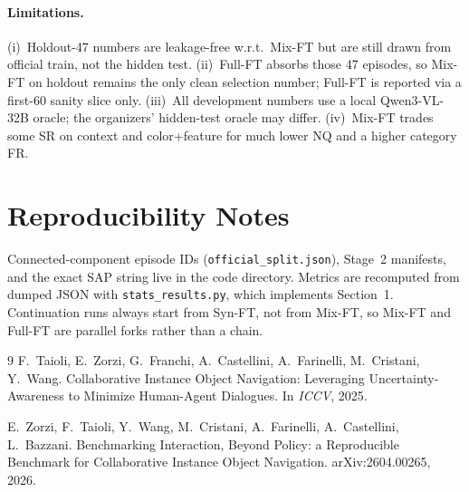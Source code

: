 \documentclass[10pt,a4paper]{article}
\begin{document}
\paragraph{Limitations.}
(i)~Holdout-47 numbers are leakage-free w.r.t.\ Mix-FT but are still
drawn from official train, not the hidden test.
(ii)~Full-FT absorbs those 47 episodes, so Mix-FT on holdout remains
the only clean selection number; Full-FT is reported via a first-60
sanity slice only.
(iii)~All development numbers use a local Qwen3-VL-32B oracle; the
organizers' hidden-test oracle may differ.
(iv)~Mix-FT trades some SR on context and color+feature for much lower
NQ and a higher category FR.

\section{Reproducibility Notes}
Connected-component episode IDs (\texttt{official\_split.json}),
Stage~2 manifests, and the exact SAP string live in the code directory.
Metrics are recomputed from dumped JSON with
\texttt{stats\_results.py}, which implements Section~1.
Continuation runs always start from Syn-FT, not from Mix-FT, so Mix-FT
and Full-FT are parallel forks rather than a chain.

\begin{thebibliography}{9}
F.~Taioli, E.~Zorzi, G.~Franchi, A.~Castellini, A.~Farinelli,
M.~Cristani, Y.~Wang.
Collaborative Instance Object Navigation: Leveraging Uncertainty-Awareness
to Minimize Human-Agent Dialogues. In \emph{ICCV}, 2025.

E.~Zorzi, F.~Taioli, Y.~Wang, M.~Cristani, A.~Farinelli, A.~Castellini,
L.~Bazzani.
Benchmarking Interaction, Beyond Policy: a Reproducible Benchmark for
Collaborative Instance Object Navigation. arXiv:2604.00265, 2026.
\end{thebibliography}
\end{document}
